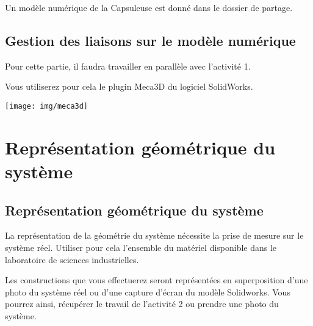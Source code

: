 Un modèle numérique de la Capsuleuse est donné dans le dossier de partage.



\subsection{Gestion des liaisons sur le modèle numérique}

Pour cette partie, il faudra travailler en parallèle avec l'activité 1.


\begin{minipage}{0.45\linewidth}
Vous utiliserez pour cela le plugin Meca3D du logiciel SolidWorks.
\end{minipage}
\hfill
\begin{minipage}{0.5\linewidth}
\texttt{[image: img/meca3d]}
\end{minipage}

\section{Représentation géométrique du système}

\subsection{Représentation géométrique du système}

La représentation de la géométrie du système nécessite la prise de mesure sur le système réel. Utiliser pour cela l'ensemble du matériel disponible dans le laboratoire de sciences industrielles.

Les constructions que vous effectuerez seront représentées en superposition d'une photo du système réel ou d'une capture d'écran du modèle Solidworks. Vous pourrez ainsi, récupérer le travail de l'activité 2 ou prendre une photo du système.


